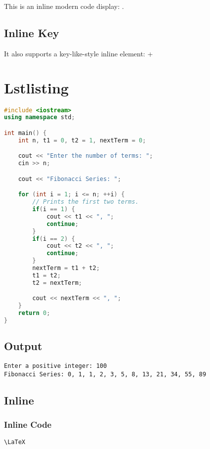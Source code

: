 \documentclass[10pt]{article}
\begin{document}
This is an inline modern code display: \moderncodeinline{\LaTeX}.

\subsection{Inline Key}

It also supports a key-like-style inline element:  + 

\section{Lstlisting}

\begin{lstlisting}[caption=Example in C++,language=c++]
#include <iostream>
using namespace std;

int main() {
	int n, t1 = 0, t2 = 1, nextTerm = 0;

	cout << "Enter the number of terms: ";
	cin >> n;

	cout << "Fibonacci Series: ";

	for (int i = 1; i <= n; ++i) {
		// Prints the first two terms.
		if(i == 1) {
			cout << t1 << ", ";
			continue;
		}
		if(i == 2) {
			cout << t2 << ", ";
			continue;
		}
		nextTerm = t1 + t2;
		t1 = t2;
		t2 = nextTerm;

		cout << nextTerm << ", ";
	}
	return 0;
}
\end{lstlisting}

\subsection{Output}

\begin{lstlisting}[style=lstoutput]
Enter a positive integer: 100
Fibonacci Series: 0, 1, 1, 2, 3, 5, 8, 13, 21, 34, 55, 89
\end{lstlisting}

\subsection{Inline}

\subsubsection{Inline Code}

\lstinline{\LaTeX}
\end{document}
